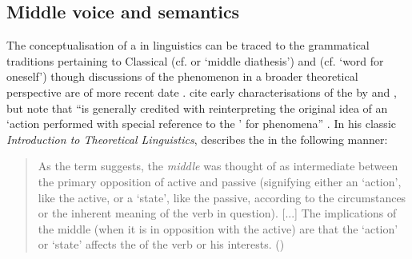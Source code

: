 \subsection{Middle voice and semantics} \label{middle-voice}
The conceptualisation of a  in linguistics can be traced to the grammatical traditions pertaining to Classical  (cf.  or  ‘middle diathesis’) and  (cf.  ‘word for oneself’) though discussions of the phenomenon in a broader theoretical perspective are of more recent date \citep[168]{zuniga:kittila:2019}. \citeauthor{zuniga:kittila:2019} cite early characterisations of the  by \citet{kruger:1846} and \citet{kurylowicz:1964}, but note that \citet{lyons:1968} “is generally credited with reinterpreting the original idea of an ‘action performed with special reference to the ’ for  phenomena” \citep[172]{zuniga:kittila:2019}. In his classic \textit{Introduction to Theoretical Linguistics}, \citeauthor{lyons:1968} describes the  in the following manner:

\begin{quote}
	As the term suggests, the \textit{middle} was thought of as intermediate between the primary opposition of active and passive (signifying either an ‘action’, like the active, or a ‘state’, like the passive, according to the circumstances or the inherent meaning of the verb in question). [...] The implications of the middle (when it is in opposition with the active) are that the ‘action’ or ‘state’ affects the  of the verb or his interests. (\citealt[373]{lyons:1968})
\end{quote} 

